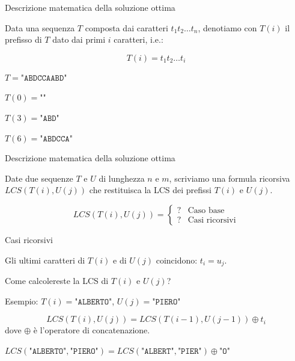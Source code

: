 \begin{frame}{Descrizione matematica della soluzione ottima}

\vspace{-9pt}
\begin{myboxtitle}
Data una sequenza $T$ composta dai caratteri $t_1t_2{\ldots}t_n$, denotiamo con $T(i)$
il \alert{prefisso} di $T$ dato dai primi $i$ caratteri, i.e.:

\[
  T(i) = t_1t_2{\ldots}t_i
\]
\end{myboxtitle}

\begin{myboxtitle}[Esempi]
\BIL
\item $T = \texttt{"ABDCCAABD"}$
\item $T(0) = \texttt{""}$
\item $T(3) = \texttt{"ABD"}$
\item $T(6) = \texttt{"ABDCCA"}$
\EIL
\end{myboxtitle}
\end{frame}

\begin{frame}{Descrizione matematica della soluzione ottima}

\vspace{-9pt}
\begin{myboxtitle}[Goal]
Date due sequenze $T$ e $U$ di lunghezza $n$ e $m$, scriviamo
una formula ricorsiva $LCS(T(i), U(j))$ che restituisca la LCS 
dei prefissi $T(i)$ e $U(j)$.
\end{myboxtitle}

\[
  LCS(T(i), U(j)) = \begin{cases}
   ? & \textrm{Caso base} \\
   ? & \textrm{Casi ricorsivi}
  \end{cases}
\]

\end{frame}

\begin{frame}{Casi ricorsivi}

\vspace{-9pt}

Gli ultimi caratteri di $T(i)$ e di $U(j)$ coincidono: \alert{$t_i = u_j$}. 

Come calcolereste la  LCS di $T(i)$ e $U(j)$?

\BIL
\item Esempio: $T(i)=\texttt{"ALBERTO"}$, $U(j)=\texttt{"PIERO"}$
\EIL

\pause
\bigskip
{}
\[
  LCS(T(i),U(j)) = LCS(T(i-1), U(j-1)) \oplus t_i
\]
dove $\oplus$ è l'operatore di concatenazione.

\BIL
\item $LCS(\texttt{"ALBERTO"},\texttt{"PIERO"}) = LCS(\texttt{"ALBERT"},\texttt{"PIER"}) \oplus \texttt{"O"}$
\EIL

\end{frame}

